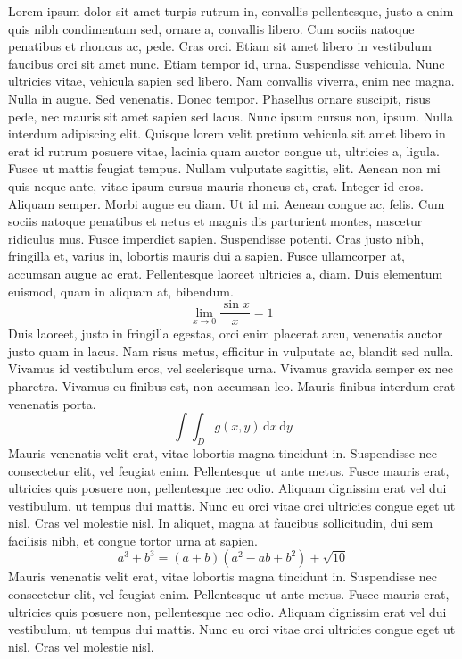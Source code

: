 \documentclass{article}
\begin{document}
Lorem ipsum dolor sit amet turpis rutrum in, convallis pellentesque, justo a enim quis nibh condimentum sed, ornare a, convallis libero. Cum sociis natoque penatibus et rhoncus ac, pede. Cras orci. Etiam sit amet libero in vestibulum faucibus orci sit amet nunc. Etiam tempor id, urna. Suspendisse vehicula. Nunc ultricies vitae, vehicula sapien sed libero. Nam convallis viverra, enim nec magna. Nulla in augue. Sed venenatis. Donec tempor. Phasellus ornare suscipit, risus pede, nec mauris sit amet sapien sed lacus. Nunc ipsum cursus non, ipsum. Nulla interdum adipiscing elit. Quisque lorem velit pretium vehicula sit amet libero in erat id rutrum posuere vitae, lacinia quam auctor congue ut, ultricies a, ligula. Fusce ut mattis feugiat tempus. Nullam vulputate sagittis, elit. Aenean non mi quis neque ante, vitae ipsum cursus mauris rhoncus et, erat. Integer id eros. Aliquam semper. Morbi augue eu diam. Ut id mi. Aenean congue ac, felis. Cum sociis natoque penatibus et netus et magnis dis parturient montes, nascetur ridiculus mus. Fusce imperdiet sapien. Suspendisse potenti. Cras justo nibh, fringilla et, varius in, lobortis mauris dui a sapien. Fusce ullamcorper at, accumsan augue ac erat. Pellentesque laoreet ultricies a, diam. Duis elementum euismod, quam in aliquam at, bibendum.
$$ 
\lim_{x \rightarrow 0} \frac{\sin x}{x}=1\
$$
Duis laoreet, justo in fringilla egestas, orci enim placerat arcu, venenatis auctor justo quam in lacus. Nam risus metus, efficitur in vulputate ac, blandit sed nulla. Vivamus id vestibulum eros, vel scelerisque urna. Vivamus gravida semper ex nec pharetra. Vivamus eu finibus est, non accumsan leo. Mauris finibus interdum erat venenatis porta. 
\begin{displaymath}
\int\!\!\!\int_{D} g(x,y)\, \mathrm{d} x\, \mathrm{d} y
\end{displaymath}
Mauris venenatis velit erat, vitae lobortis magna tincidunt in. Suspendisse nec consectetur elit, vel feugiat enim. Pellentesque ut ante metus. Fusce mauris erat, ultricies quis posuere non, pellentesque nec odio. Aliquam dignissim erat vel dui vestibulum, ut tempus dui mattis. Nunc eu orci vitae orci ultricies congue eget ut nisl. Cras vel molestie nisl. In aliquet, magna at faucibus sollicitudin, dui sem facilisis nibh, et congue tortor urna at sapien.
\[ a^{3} + b^{3} = (a+b)(a^{2}-ab+b^{2}) + \sqrt{10} \]
Mauris venenatis velit erat, vitae lobortis magna tincidunt in. Suspendisse nec consectetur elit, vel feugiat enim. Pellentesque ut ante metus. Fusce mauris erat, ultricies quis posuere non, pellentesque nec odio. Aliquam dignissim erat vel dui vestibulum, ut tempus dui mattis. Nunc eu orci vitae orci ultricies congue eget ut nisl. Cras vel molestie nisl.
\end{document}
